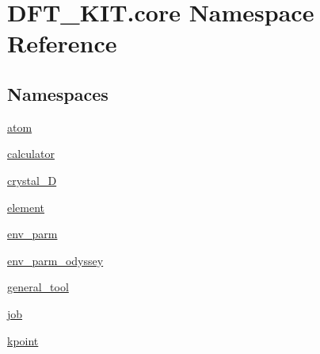 \hypertarget{namespace_d_f_t___k_i_t_1_1core}{\section{D\+F\+T\+\_\+\+K\+I\+T.\+core Namespace Reference}
\label{namespace_d_f_t___k_i_t_1_1core}
}
\subsection*{Namespaces}
\begin{DoxyCompactItemize}
\item 
 \hyperlink{namespace_d_f_t___k_i_t_1_1core_1_1atom}{atom}
\item 
 \hyperlink{namespace_d_f_t___k_i_t_1_1core_1_1calculator}{calculator}
\item 
 \hyperlink{namespace_d_f_t___k_i_t_1_1core_1_1crystal__3_d}{crystal\+\_\+D}
\item 
 \hyperlink{namespace_d_f_t___k_i_t_1_1core_1_1element}{element}
\item 
 \hyperlink{namespace_d_f_t___k_i_t_1_1core_1_1env__parm}{env\+\_\+parm}
\item 
 \hyperlink{namespace_d_f_t___k_i_t_1_1core_1_1env__parm__odyssey}{env\+\_\+parm\+\_\+odyssey}
\item 
 \hyperlink{namespace_d_f_t___k_i_t_1_1core_1_1general__tool}{general\+\_\+tool}
\item 
 \hyperlink{namespace_d_f_t___k_i_t_1_1core_1_1job}{job}
\item 
 \hyperlink{namespace_d_f_t___k_i_t_1_1core_1_1kpoint}{kpoint}
\end{DoxyCompactItemize}
